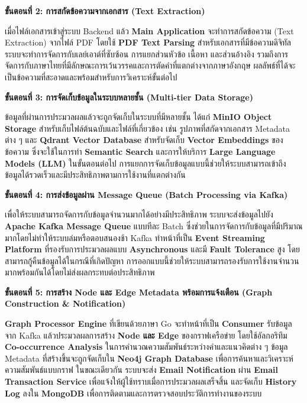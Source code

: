 \documentclass[12pt,a4paper]{article}
\begin{document}
\begin{enumerate}[leftmargin=2cm]
\begin{enumerate}
{            \textbf{ขั้นตอนที่ 2: การสกัดข้อความจากเอกสาร (Text Extraction)}

            \hspace{1cm}เมื่อไฟล์เอกสารเข้าสู่ระบบ Backend แล้ว \textbf{Main Application} จะทำการสกัดข้อความ (Text Extraction) จากไฟล์ PDF โดยใช้ \textbf{PDF Text Parsing} สำหรับเอกสารที่มีข้อความดิจิทัล ระบบจะทำการจัดการกับเลย์เอาต์ที่ซับซ้อน การแยกส่วนหัวข้อ เนื้อหา และส่วนอ้างอิง รวมถึงการจัดการกับภาษาไทยที่มีลักษณะการเว้นวรรคและการตัดคำที่แตกต่างจากภาษาอังกฤษ ผลลัพธ์ที่ได้จะเป็นข้อความที่สะอาดและพร้อมสำหรับการวิเคราะห์ขั้นต่อไป

            \vspace{0.3cm}

            \textbf{ขั้นตอนที่ 3: การจัดเก็บข้อมูลในระบบหลายชั้น (Multi-tier Data Storage)}

            \hspace{1cm}ข้อมูลที่ผ่านการประมวลผลแล้วจะถูกจัดเก็บในระบบที่มีหลายชั้น ได้แก่ \textbf{MinIO Object Storage} สำหรับเก็บไฟล์ต้นฉบับและไฟล์ที่เกี่ยวข้อง เช่น รูปภาพที่สกัดจากเอกสาร Metadata ต่าง ๆ และ \textbf{Qdrant Vector Database} สำหรับจัดเก็บ \textbf{Vector Embeddings} ของข้อความ ซึ่งจะใช้ในการทำ \textbf{Semantic Search} และการให้บริการ \textbf{Large Language Models (LLM)} ในขั้นตอนต่อไป การแยกการจัดเก็บข้อมูลแบบนี้ช่วยให้ระบบสามารถเข้าถึงข้อมูลได้รวดเร็วและมีประสิทธิภาพตามการใช้งานที่แตกต่างกัน

            \vspace{0.3cm}

            \textbf{ขั้นตอนที่ 4: การส่งข้อมูลผ่าน Message Queue (Batch Processing via Kafka)}

            \hspace{1cm}เพื่อให้ระบบสามารถจัดการกับข้อมูลจำนวนมากได้อย่างมีประสิทธิภาพ ระบบจะส่งข้อมูลไปยัง \textbf{Apache Kafka Message Queue} แบบทีละ Batch ซึ่งช่วยในการจัดการกับข้อมูลที่มีปริมาณมากโดยไม่ทำให้ระบบล่มหรือตอบสนองช้า Kafka ทำหน้าที่เป็น \textbf{Event Streaming Platform} ที่รองรับการประมวลผลแบบ \textbf{Asynchronous} และมี \textbf{Fault Tolerance} สูง โดยสามารถกู้คืนข้อมูลได้ในกรณีที่เกิดปัญหา การออกแบบนี้ช่วยให้ระบบสามารถรองรับการใช้งานจำนวนมากพร้อมกันได้โดยไม่ส่งผลกระทบต่อประสิทธิภาพ

            \vspace{0.3cm}

            \textbf{ขั้นตอนที่ 5: การสร้าง Node และ Edge Metadata พร้อมการแจ้งเตือน (Graph Construction \& Notification)}

            \hspace{1cm}\textbf{Graph Processor Engine} ที่เขียนด้วยภาษา Go จะทำหน้าที่เป็น \textbf{Consumer} รับข้อมูลจาก Kafka แล้วประมวลผลการสร้าง \textbf{Node และ Edge} ของกราฟเครือข่าย โดยใช้อัลกอริทึม \textbf{Co-occurrence Analysis} ในการคำนวณความสัมพันธ์ระหว่างคำและแนวคิดต่าง ๆ ข้อมูล Metadata ที่สร้างขึ้นจะถูกจัดเก็บใน \textbf{Neo4j Graph Database} เพื่อการค้นหาและวิเคราะห์ความสัมพันธ์แบบกราฟ ในขณะเดียวกัน ระบบจะส่ง \textbf{Email Notification} ผ่าน \textbf{Email Transaction Service} เพื่อแจ้งให้ผู้ใช้ทราบเมื่อการประมวลผลเสร็จสิ้น และจัดเก็บ \textbf{History Log} ลงใน \textbf{MongoDB} เพื่อการติดตามและการตรวจสอบประวัติการทำงานของระบบ

}
\end{enumerate}
\end{enumerate}
\end{document}
